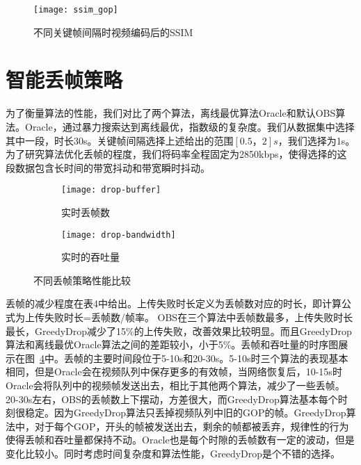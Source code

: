 \begin{figure}[htb]%
  \centering
  \texttt{[image: ssim\_gop]}
  \caption{不同关键帧间隔时视频编码后的SSIM}
  \label{fig:ssim_gop}
\end{figure}

\section{智能丢帧策略}
为了衡量算法的性能，我们对比了两个算法，离线最优算法Oracle和默认OBS算法。Oracle，通过暴力搜索达到离线最优，指数级的复杂度。我们从数据集中选择其中一段，时长30s。关键帧间隔选择上述给出的范围$[0.5，2]s$，我们选择为1s。为了研究算法优化丢帧的程度，我们将码率全程固定为2850kbps，使得选择的这段数据包含长时间的带宽抖动和带宽瞬时抖动。

\begin{figure}[htb]
  \centering%
  \begin{subfigure}{0.7\textwidth}
    \texttt{[image: drop-buffer]}
    \caption{实时丢帧数}
    \label{fig:drop-buffer}
  \end{subfigure}%
  \vfill
  \vspace{0.2in}
  \begin{subfigure}{0.7\textwidth}
    \texttt{[image: drop-bandwidth]}
    \caption{实时的吞吐量}
    \label{fig:drop-bandwidth}
  \end{subfigure}
  \caption{不同丢帧策略性能比较}
  \label{fig:drop_comparison}
\end{figure}

丢帧的减少程度在表4中给出。上传失败时长定义为丢帧数对应的时长，即计算公式为上传失败时长=丢帧数/帧率。
OBS在三个算法中丢帧数最多，上传失败时长最长，GreedyDrop减少了15\%的上传失败，改善效果比较明显。而且GreedyDrop算法和离线最优Oracle算法之间的差距较小，小于5\%。丢帧和吞吐量的时序图展示在图~\ref{fig:drop_comparison}中。丢帧的主要时间段位于5-10s和20-30s。5-10s时三个算法的表现基本相同，但是Oracle会在视频队列中保存更多的有效帧，当网络恢复后，10-15s时Oracle会将队列中的视频帧发送出去，相比于其他两个算法，减少了一些丢帧。20-30s左右，OBS的丢帧数上下摆动，方差很大，而GreedyDrop算法基本每个时刻很稳定。因为GreedyDrop算法只丢掉视频队列中旧的GOP的帧。GreedyDrop算法中，对于每个GOP，开头的帧被发送出去，剩余的帧都被丢弃，规律性的行为使得丢帧和吞吐量都保持不动。Oracle也是每个时隙的丢帧数有一定的波动，但是变化比较小。同时考虑时间复杂度和算法性能，GreedyDrop是个不错的选择。


